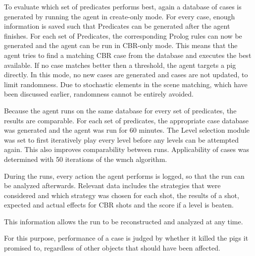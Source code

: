 To evaluate which set of predicates performs best, again a database of cases is generated by running the agent in create-only mode.
For every case, enough information is saved such that Predicates can be generated after the agent finishes. For each set of Predicates, the corresponding Prolog rules can now be generated and the agent can be run in CBR-only mode. This means that the agent tries to find a matching CBR case from the database and executes the best available. If no case matches better then a threshold, the agent targets a pig directly. In this mode, no new cases are generated and cases are not updated, to limit randomness. Due to stochastic elements in the scene matching, which have been discussed earlier, randomness cannot be entirely avoided.

Because the agent runs on the same database for every set of predicates, the results are comparable. For each set of predicates, the appropriate case database was generated and the agent was run for 60 minutes. The Level selection module was set to first iteratively play every level before any levels can be attempted again.
This also improves comparability between runs. Applicability of cases was determined with 50 iterations of the wmch algorithm.

During the runs, every action the agent performs is logged, so that the run can be analyzed afterwards. Relevant data includes the strategies that were considered and which strategy was chosen for each shot, the results of a shot, expected and actual effects for CBR shots and the score if a level is beaten.

This information allows the run to be reconstructed and analyzed at any time.

For this purpose, performance of a case is judged by whether it killed the pigs it promised to, regardless of other objects that should have been affected.
